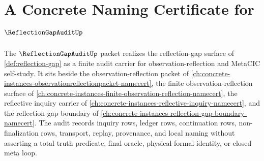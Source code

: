 \chapter{A Concrete Naming Certificate for $\ReflectionGapAuditUp$}
\label{ch:concrete-instances-reflection-gap-audit-namecert}

The $\ReflectionGapAuditUp$ packet realizes the reflection-gap surface of \autoref{def:reflection-gap} as a finite audit carrier for observation-reflection and MetaCIC self-study. It sits beside the observation-reflection packet of \autoref{ch:concrete-instances-observationreflectionpacket-namecert}, the finite observation-reflection surface of \autoref{ch:concrete-instances-finite-observation-reflection-namecert}, the reflective inquiry carrier of \autoref{ch:concrete-instances-reflective-inquiry-namecert}, and the reflection-gap boundary of \autoref{ch:concrete-instances-reflection-gap-boundary-namecert}. The audit records inquiry rows, ledger rows, continuation rows, non-finalization rows, transport, replay, provenance, and local naming without asserting a total truth predicate, final oracle, physical-formal identity, or closed meta loop.

